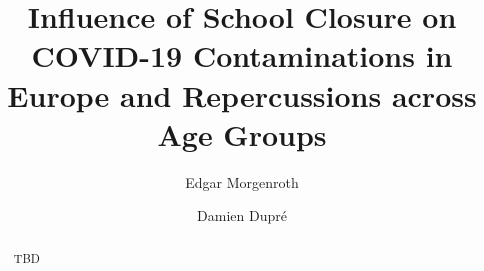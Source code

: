 \documentclass[]{elsarticle} %
\begin{document}
\begin{frontmatter}

  \title{Influence of School Closure on COVID-19 Contaminations in Europe and Repercussions across Age Groups}
    \author[Dublin City University]{Edgar Morgenroth%
  }
    \author[Dublin City University]{Damien Dupré%
  }
  
  \begin{abstract}
  TBD
  \end{abstract}
  
 \end{frontmatter}




\end{document}

